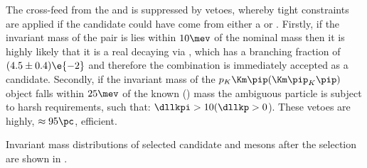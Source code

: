 The cross-feed from the \Dp and \Lc is suppressed by vetoes, whereby tight \pid constraints are
applied if the \dstokkpi candidate could have come from either a \Dp or \Lc.
Firstly, if the invariant mass of the \kk pair is lies within $10\mev$ of the nominal \phii mass
then it is highly likely that it is a real \Ds decaying via \decay{\Ds}{\phi\pip}, which has a
branching fraction of $(4.5\pm0.4)\e{-2}$ and therefore the \kkpi combination is immediately
accepted as a \Ds candidate.
Secondly, if the invariant mass of the $p_K\Km\pip(\Km\pip_K\pip)$ object falls within $25\mev$ of
the known \Dp(\Lc) mass the ambiguous particle is subject to harsh \pid requirements, such that:
$\dllkpi>10(\dllkp>0$).
These vetoes are highly, $\approx95\pc$, efficient.



















Invariant mass distributions of
selected candidate \Ds and \phii mesons after the selection are shown in .

